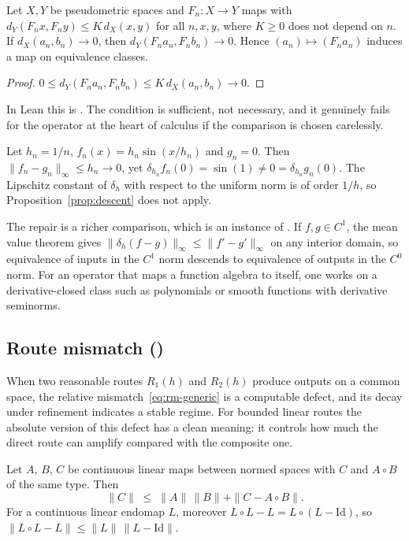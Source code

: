 \begin{proposition}\label{prop:descent}
Let $X,Y$ be pseudometric spaces and $F_n:X\to Y$ maps with $d_Y(F_n x,F_n y)\le K\,d_X(x,y)$ for all $n,x,y$, where $K\ge 0$ does not depend on $n$.
If $d_X(a_n,b_n)\to 0$, then $d_Y(F_n a_n,F_n b_n)\to 0$. Hence $(a_n)\mapsto(F_n a_n)$ induces a map on equivalence classes.
\end{proposition}

\begin{proof}
$0\le d_Y(F_n a_n,F_n b_n)\le K\,d_X(a_n,b_n)\to 0$.
\end{proof}

\noindent In Lean this is .
The condition is sufficient, not necessary, and it genuinely fails for the operator at the heart of calculus if the comparison is chosen carelessly.

\begin{example}\label{ex:no-descent}
Let $h_n=1/n$, $f_n(x)=h_n\sin(x/h_n)$ and $g_n=0$. Then $\|f_n-g_n\|_\infty\le h_n\to 0$, yet $\delta_{h_n}f_n(0)=\sin(1)\ne 0=\delta_{h_n}g_n(0)$.
The Lipschitz constant of $\delta_h$ with respect to the uniform norm is of order $1/h$, so Proposition~\ref{prop:descent} does not apply.
\end{example}

The repair is a richer comparison, which is an instance of \Pone.
If $f,g\in C^1$, the mean value theorem gives $\|\delta_h(f-g)\|_\infty\le\|f'-g'\|_\infty$ on any interior domain, so equivalence of inputs in the $C^1$ norm descends to equivalence of outputs in the $C^0$ norm.
For an operator that maps a function algebra to itself, one works on a derivative-closed class such as polynomials or smooth functions with derivative seminorms.

\subsection{Route mismatch (\Pthree)}
When two reasonable routes $R_1(h)$ and $R_2(h)$ produce outputs on a common space, the relative mismatch~\eqref{eq:rm-generic} is a computable defect, and its decay under refinement indicates a stable regime.
For bounded linear routes the absolute version of this defect has a clean meaning: it controls how much the direct route can amplify compared with the composite one.

\begin{proposition}\label{prop:route-gain}
Let $A$, $B$, $C$ be continuous linear maps between normed spaces with $C$ and $A\circ B$ of the same type. Then
\[
  \|C\|\;\le\;\|A\|\,\|B\|+\|C-A\circ B\|.
\]
For a continuous linear endomap $L$, moreover $L\circ L-L=L\circ(L-\mathrm{Id})$, so $\|L\circ L-L\|\le\|L\|\,\|L-\mathrm{Id}\|$.
\end{proposition}

